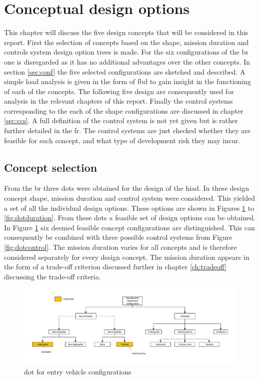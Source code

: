 \section{Conceptual design options} \label{ch:options}
This chapter will discuss the five design concepts that will be considered in this report. First the selection of concepts based on the shape, mission duration and controls system design option trees is made. For the six configurations of the \gls{br} one is disregarded as it has no additional advantages over the other concepts. In section \ref{sec:conf} the five selected configurations are sketched and described. A simple load analysis is given in the form of \gls{fbd} to gain insight in the functioning of each of the concepts. The following five design are consequently used for analysis in the relevant chapters of this report. Finally the control systems corresponding to the each of the shape configurations are discussed in chapter \ref{sec:ccs}. A full definition of the control system is not yet given but is rather further detailed in the \gls{fr}. The control systems are just checked whether they are feasible for each concept, and what type of development risk they may incur.

\subsection{Concept selection}
 From the \acrfull{br} three \glspl{dot} were obtained for the design of the \gls{hiad}. In these design concept shape, mission duration and control system were considered. This yielded a set of all the individual design options. These options are shown in Figures \ref{fig:dotshape} to \ref{fig:dotduration}. From these \glspl{dot} a feasible set of design options can be obtained. In Figure  \ref{fig:dotshape} six deemed feasible concept configurations are distinguished. This can consequently be combined with three possible control systems from Figure  \ref{fig:dotcontrol}. The mission duration varies for all concepts and is therefore considered separately for every design concept. The mission duration appears in the form of a trade-off criterion discussed further in chapter \ref{ch:tradeoff} discussing the trade-off criteria.

\begin{figure}[H]
\hspace{-23mm}
\includegraphics[width = 1.25\textwidth]{Figure/DOT_configuration.pdf}
\vspace{-5mm}
\caption{\acrfull{dot} for entry vehicle configurations}
\label{fig:dotshape}
\end{figure}


